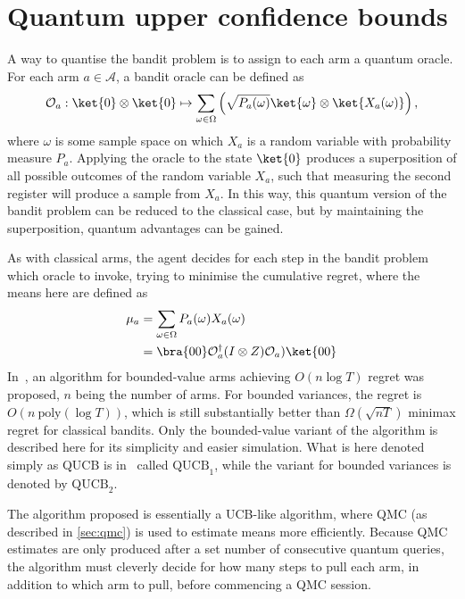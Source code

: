 \section{Quantum upper confidence bounds}
\label{sec:wan2022}
A way to quantise the bandit problem is to assign to each arm a quantum oracle.
For each arm $a \in \mathcal{A}$, a bandit oracle can be defined as
\begin{equation}
    \mathcal{O}_a: \ket{0}\otimes\ket{0} \mapsto \sum_{\omega \in \Omega} \left(\sqrt{P_a(\omega)} \ket{\omega} \otimes \ket{X_a(\omega)} \right),
    \label{eq:wan_oracle}
\end{equation}
where $\omega$ is some sample space on which $X_a$ is a random variable with probability measure $P_a$.
Applying the oracle to the state $\ket{0}$ produces a superposition of all possible outcomes of the random variable $X_a$, such that measuring the second register will produce a sample from $X_a$.
In this way, this quantum version of the bandit problem can be reduced to the classical case, but by maintaining the superposition, quantum advantages can be gained.

As with classical arms, the agent decides for each step in the bandit problem which oracle to invoke, trying to minimise the cumulative regret, where the means here are defined as
\begin{equation}
    \begin{aligned}
        \mu_a
         & = \sum_{\omega \in \Omega} P_a(\omega) X_a(\omega)                     \\
         & = \bra{00} \mathcal{O}_a^\dagger (I \otimes Z) \mathcal{O}_a) \ket{00} \\
    \end{aligned}
\end{equation}
In~\autocite{wan2022}, an algorithm for bounded-value arms achieving $O(n \log T)$ regret was proposed, $n$ being the number of arms.
For bounded variances, the regret is $O(n \ \text{poly}(\log T))$, which is still substantially better than $\Omega(\sqrt{nT})$ minimax regret for classical bandits.
Only the bounded-value variant of the algorithm is described here for its simplicity and easier simulation.
What is here denoted simply as QUCB is in~\autocite{wan2022} called $\text{QUCB}_1$, while the variant for bounded variances is denoted by $\text{QUCB}_2$.

The algorithm proposed is essentially a UCB-like algorithm\footnotemark, where QMC (as described in \cref{sec:qmc}) is used to estimate means more efficiently.
Because QMC estimates are only produced after a set number of consecutive quantum queries, the algorithm must cleverly decide for how many steps to pull each arm, in addition to which arm to pull, before commencing a QMC session.


